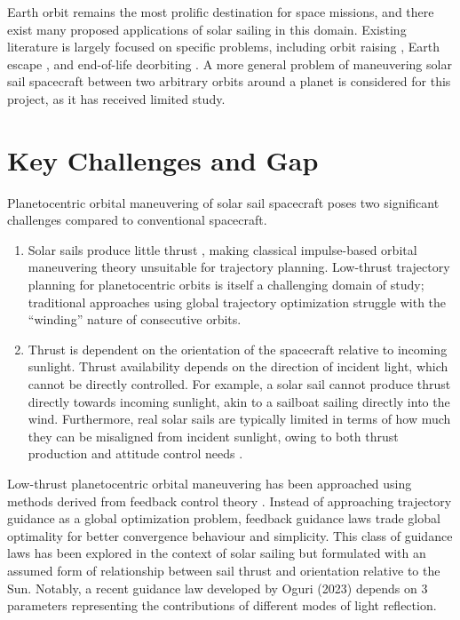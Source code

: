 Earth orbit remains the most prolific destination for space missions, and there exist many proposed applications of solar sailing in this domain. Existing literature is largely focused on specific problems, including orbit raising \cite{fieseler1998method}, Earth escape \cite{coverstone2003technique}, and end-of-life deorbiting \cite{lappas2011deorbitsail}. A more general problem of maneuvering solar sail spacecraft between two arbitrary orbits around a planet is considered for this project, as it has received limited study.

\section{Key Challenges and Gap}
Planetocentric orbital maneuvering of solar sail spacecraft poses two significant challenges compared to conventional spacecraft.
\begin{enumerate}
  \item Solar sails produce little thrust \cite{mcinnes}, making classical impulse-based orbital maneuvering theory unsuitable for trajectory planning. Low-thrust trajectory planning for planetocentric orbits is itself a challenging domain of study; traditional approaches using global trajectory optimization struggle with the ``winding'' nature of consecutive orbits.
  \item Thrust is dependent on the orientation of the spacecraft relative to incoming sunlight. Thrust availability depends on the direction of incident light, which cannot be directly controlled. For example, a solar sail cannot produce thrust directly towards incoming sunlight, akin to a sailboat sailing directly into the wind. Furthermore, real solar sails are typically limited in terms of how much they can be misaligned from incident sunlight, owing to both thrust production and attitude control needs \cite{mcinnes}.
\end{enumerate}

Low-thrust planetocentric orbital maneuvering has been approached using methods derived from feedback control theory \cite{ilgen1994low, petropoulos2004low, vargaperez2016, sanjeev2023}. Instead of approaching trajectory guidance as a global optimization problem, feedback guidance laws trade global optimality for better convergence behaviour and simplicity. This class of guidance laws has been explored in the context of solar sailing but formulated with an assumed form of relationship between sail thrust and orientation relative to the Sun. Notably, a recent guidance law developed by Oguri (2023) \cite{oguri2023solar} depends on 3 parameters representing the contributions of different modes of light reflection.

